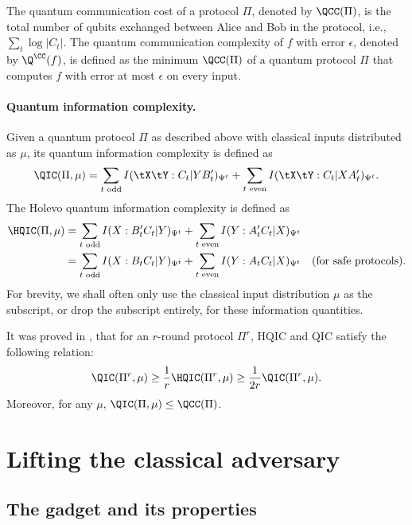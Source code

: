 The quantum communication cost of a protocol $\Pi$, denoted by $\QCC(\Pi)$, is the total number of qubits exchanged between Alice and Bob in the protocol, i.e., $\sum_t\log|C_t|$. The quantum communication complexity of $f$ with error $\epsilon$, denoted by $\Q^\CC(f)$, is defined as the minimum $\QCC(\Pi)$ of a quantum protocol $\Pi$ that computes $f$ with error at most $\epsilon$ on every input.

\paragraph{Quantum information complexity.} Given a quantum protocol $\Pi$ as described above with classical inputs distributed as $\mu$, its quantum information complexity is defined as
\[ \QIC(\Pi,\mu) = \sum_{t \text{ odd}}I(\tX\tY:C_t|YB'_t)_{\Psi^t} + \sum_{t\text{ even}}I(\tX\tY:C_t|XA'_t)_{\Psi^t}.\]
The Holevo quantum information complexity is defined as
\begin{align*}
\HQIC(\Pi,\mu) & = \sum_{t\text{ odd}}I(X:B'_tC_t|Y)_{\Psi^t} + \sum_{t\text{ even}}I(Y:A'_tC_t|X)_{\Psi^t} \\
 & = \sum_{t\text{ odd}}I(X:B_tC_t|Y)_{\Psi^t} + \sum_{t\text{ even}}I(Y:A_tC_t|X)_{\Psi^t} \quad \text{(for safe protocols).}
\end{align*}
For brevity, we shall often only use the classical input distribution $\mu$ as the subscript, or drop the subscript entirely, for these information quantities.

It was proved in \cite{LT17}, that for an $r$-round protocol $\Pi^r$, HQIC and QIC satisfy the following relation:
\[ \QIC(\Pi^r, \mu) \geq \frac{1}{r}\HQIC(\Pi^r, \mu) \geq \frac{1}{2r}\QIC(\Pi^r,\mu).\]
Moreover, for any $\mu$, $\QIC(\Pi,\mu) \leq \QCC(\Pi)$.

\section{Lifting the classical adversary}

\subsection{The gadget and its properties}

